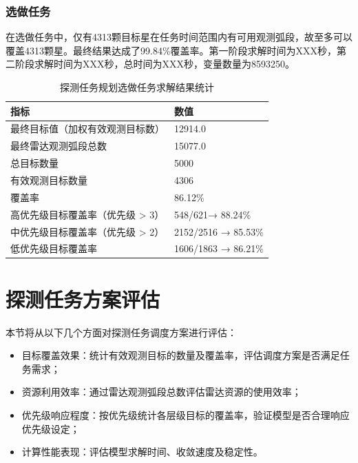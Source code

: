 \documentclass[openany,12pt,UTF8]{ctexart}
\begin{document}
\subsubsection{选做任务}
在选做任务中，仅有4313颗目标星在任务时间范围内有可用观测弧段，故至多可以覆盖4313颗星。最终结果达成了99.84\%覆盖率。第一阶段求解时间为XXX秒，第二阶段求解时间为XXX秒，总时间为XXX秒，变量数量为8593250。
\begin{table}[h]
    \centering
    \caption{探测任务规划选做任务求解结果统计}
    \label{tab:探测任务规划选做任务求解结果统计}
    \begin{tabularx}{0.8\columnwidth}{Xl}
        \toprule
        \textbf{指标}        & \textbf{数值}      \\
        \midrule
        最终目标值（加权有效观测目标数）   & 12914.0           \\
        最终雷达观测弧段总数         & 15077.0            \\
        总目标数量              & 5000              \\
        有效观测目标数量           & 4306              \\
        覆盖率                & 86.12\%          \\
        高优先级目标覆盖率（优先级 > 3） & 548/621→ 88.24\%  \\
        中优先级目标覆盖率（优先级 > 2） & 2152/2516 → 85.53\%  \\
        低优先级目标覆盖率          & 1606/1863 → 86.21\% \\
        \bottomrule
    \end{tabularx}
\end{table}

\section{探测任务方案评估}
本节将从以下几个方面对探测任务调度方案进行评估：
\begin{itemize}
    \item {目标覆盖效果}：统计有效观测目标的数量及覆盖率，评估调度方案是否满足任务需求；
    \item {资源利用效率}：通过雷达观测弧段总数评估雷达资源的使用效率；
    \item {优先级响应程度}：按优先级统计各层级目标的覆盖率，验证模型是否合理响应优先级设定；
    \item {计算性能表现}：评估模型求解时间、收敛速度及稳定性。
\end{itemize}
\end{document}
